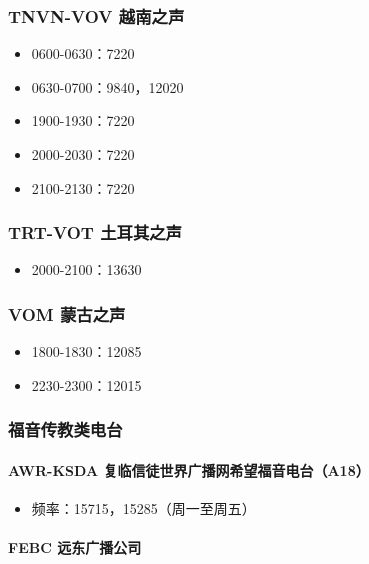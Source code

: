 \documentclass[12pt,UTF8]{ctexbook}
\begin{document}
\subsubsection{TNVN-VOV 越南之声}

\begin{itemize}[leftmargin=2cm]
    \item 0600-0630：7220
    \item 0630-0700：9840，12020
    \item 1900-1930：7220
    \item 2000-2030：7220
    \item 2100-2130：7220
\end{itemize}

\subsubsection{TRT-VOT 土耳其之声}

\begin{itemize}[leftmargin=2cm]
    \item 2000-2100：13630
\end{itemize}

\subsubsection{VOM 蒙古之声}

\begin{itemize}[leftmargin=2cm]
    \item 1800-1830：12085
    \item 2230-2300：12015
\end{itemize}

\subsubsection{福音传教类电台}

\paragraph{AWR-KSDA 复临信徒世界广播网希望福音电台（A18）}

\begin{itemize}[leftmargin=2cm]
    \item 频率：15715，15285（周一至周五）
\end{itemize}

\paragraph{FEBC 远东广播公司}
\end{document}
